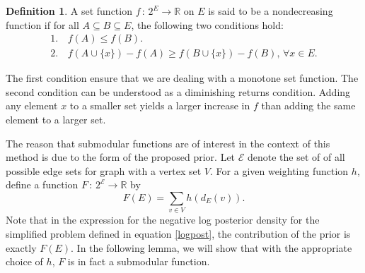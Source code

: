 \documentclass{uwstat572}
\theoremstyle{remark}
\theoremstyle{definition}
\newtheorem{definition}{Definition}[section]
\begin{document}
\theoremstyle{definition}
\begin{definition}
A set function $f \, : \, 2^E \to \mathbb{R}$ on $E$ is said to be a nondecreasing  function if for all $A \subseteq B \subseteq E$, the following two conditions hold:
\begin{equation*}
\begin{aligned}
1. \,& f(A) \leq f(B).
\\
2. \, & f(A \cup \{x\}) - f(A) \geq f(B \cup \{x\}) - f(B), \, \forall x \in E.
\end{aligned}
\end{equation*}
\end{definition}

The first condition ensure that we are dealing with a monotone set function. The second condition can be understood as a diminishing returns condition.  Adding any element $x$ to a smaller set yields a larger increase in $f$ than adding the same element to a larger set.

The reason that submodular functions are of interest in the context of this method is due to the form of the proposed prior.  Let $\mathcal{E}$ denote the set of of all possible edge sets for graph with a vertex set $V$.  For a given weighting function $h$, define a function $F \, : \, 2^{\mathcal{E}} \to \mathbb{R}$ by
\begin{equation}\label{F}
F(E) = \sum_{v \in V} h(d_E(v)).
\end{equation}
Note that in the expression for the  negative log posterior density for the simplified problem defined in equation \eqref{logpost}, the contribution of the prior is exactly $ F(E)$.  In the following lemma, we will show that with the appropriate choice of $h$, $F$ is in fact a submodular function.
\end{document}
